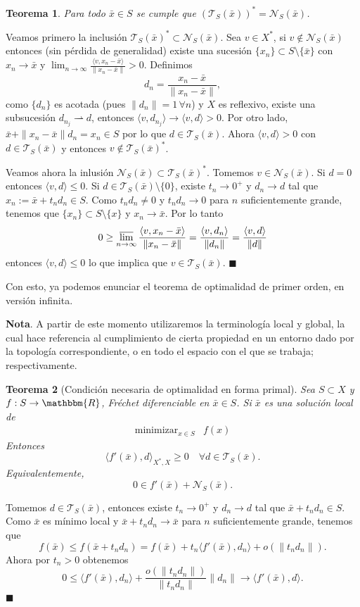 \documentclass[a4paper,10pt]{book}
\newcommand{\R}{\mathbbm{R}}
\newcommand{\arr}{\rightarrow}
\newcommand{\bx}{\bar{x}}
\newcommand{\cN}{\mathcal{N}}
\newcommand{\cT}{\mathcal{T}}
\newcommand{\la}{\langle}
\newcommand{\ra}{\rangle}
\newcommand{\deb}{\rightharpoonup}
\newtheorem{teo}{Teorema}[section]
\newenvironment{dem}{\vspace*{-0.1cm}{\it Demostraci\'on:}}{\hfill
$\blacksquare$\\}
\begin{document}
\begin{teo}
Para todo $\bx\in S$ se cumple que $(\cT_{S}(\bx))^*=\cN_{S}(\bx)$.
\end{teo} 
\begin{dem}
Veamos primero la inclusión $\cT_S(\bx)^*\subset \cN_S(\bx)$. Sea $v\in X^*$, si $v\notin\cN_S(\bx)$ entonces (sin pérdida de generalidad) existe una sucesión $\{x_n\}\subset S\setminus\{\bx\}$ con $x_n\to \bx$ y $\lim_{n\to\infty}\frac{\la v, x_n-\bx\ra}{\|x_n-\bx\|}>0$. Definimos $$d_n=\frac{x_n-\bx}{\|x_n-\bx\|},$$ como $\{d_n\}$ es acotada (pues $\|d_n\|=1\,\forall n$) y $X$ es reflexivo, existe una subsucesión $d_{n_j}\deb d$, entonces $\la v , d_{n_j}\ra\to\la v , d\ra>0$. Por otro lado, $\bx+\|x_n-\bx\|d_n=x_n\in S$ por lo que $d\in \cT_S(\bx)$. Ahora $\la v , d\ra>0$ con $d\in\cT_S(\bx)$ y entonces $v\notin\cT_S(\bx)^*$.

Veamos ahora la inlusión $\cN_S(\bx)\subset\cT_S(\bx)^*$. Tomemos $v\in\cN_S(\bx)$. Si $d=0$ entonces $\la v,d\ra\leq0$. Si $d\in\cT_S(\bx)\setminus\{0\}$, existe $t_n\to 0^+$ y $d_n\to d$ tal que $x_n:=\bx+t_nd_n\in S$. Como $t_nd_n\neq0$ y $t_nd_n\to 0$ para $n$ suficientemente grande, tenemos que $\{x_n\}\subset S\setminus\{x\}$ y $x_n\to\bx$. Por lo tanto $$0\geq\varlimsup_{n\to\infty}\frac{\la v,x_n-\bx\ra}{\|x_n-\bx\|}=\frac{\la v,d_n\ra}{\|d_n\|}=\frac{\la v,d\ra}{\|d\|}$$ entonces $\la v,d\ra\leq0$ lo que implica que $v\in \cT_S(\bx)$.
\end{dem}

Con esto, ya podemos enunciar el teorema de optimalidad de primer orden, en versión infinita.

\textbf{Nota}. A partir de este momento utilizaremos la terminología local y global, la cual hace referencia al cumplimiento de cierta propiedad en un entorno dado por la topología correspondiente, o en todo el espacio con el que se trabaja; respectivamente. 

\begin{teo}[Condición necesaria de optimalidad en forma primal]
Sea $S\subset X$ y $f:S\arr\R$, Fréchet diferenciable en $\bx\in S$. Si $\bx$ es una solución local de \[
\begin{array}{rl}
\displaystyle \mathop{\mathrm{minimizar}}_{x\in S} & \displaystyle f(x)
\end{array}
\]   
Entonces $$\langle f'(\bx) , d\rangle_{X^*,X}\geq 0 \quad\forall d\in \cT_S(\bx).$$
Equivalentemente,
$$ 0\in f'(\bx)+ \cN_{S}(\bx).$$
\end{teo}
\begin{dem}
Tomemos $d\in\cT_S(\bx)$, entonces existe $t_n\to 0^+$ y $d_n\to d$ tal que $\bx+t_nd_n\in S$. Como $\bx$ es mínimo local y $\bx+t_nd_n\to\bx$ para $n$ suficientemente grande, tenemos que $$f(\bx)\leq f(\bx+t_nd_n)=f(\bx)+t_n\la f'(\bx),d_n\ra+o(\|t_nd_n\|).$$ Ahora por $t_n>0$ obtenemos $$0\leq\la f'(\bx),d_n\ra+\frac{o(\|t_nd_n\|)}{\|t_n d_n\|}\|d_n\|\to\la f'(\bx),d\ra.$$
\end{dem}
\end{document}

